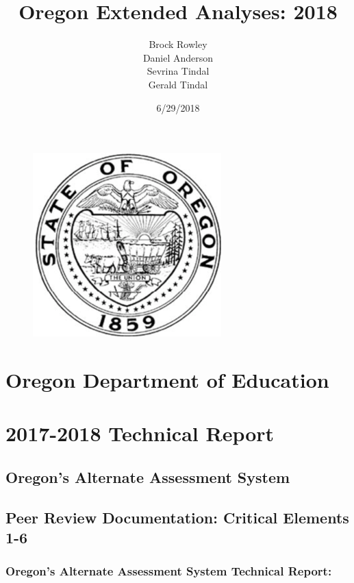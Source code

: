 \documentclass[]{article}
\title{Oregon Extended Analyses: 2018}
\author{Brock Rowley \\ Daniel Anderson \\ Sevrina Tindal \\ Gerald Tindal}
\date{6/29/2018}
\begin{document}
\maketitle

{
\setcounter{tocdepth}{4}
\tableofcontents
}
\newpage

\begin{figure}
\centering
\includegraphics{img/stateofOR.png}
\caption{}
\end{figure}

\section{Oregon Department of
Education}\label{oregon-department-of-education}

\section{2017-2018 Technical Report}\label{technical-report}

\subsection{Oregon's Alternate Assessment
System}\label{oregons-alternate-assessment-system}

\subsection{Peer Review Documentation: Critical Elements
1-6}\label{peer-review-documentation-critical-elements-1-6}

\subsubsection{Oregon's Alternate Assessment System Technical
Report:}\label{oregons-alternate-assessment-system-technical-report}
\end{document}
